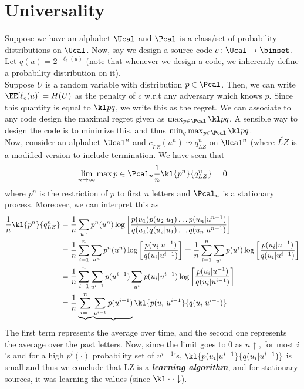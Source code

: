 \section{Universality}
Suppose we have an alphabet $\Ucal$ and $\Pcal$ is a class/set of probability distributions on $\Ucal$. Now, say we design a source code $c: \Ucal \to \binset$. Let $q(u) = 2^{-\ell_c(u)}$ (note that whenever we design a code, we inherently define a probability distribution on it). \\Suppose $U$ is a random variable with distribution $p \in \Pcal$. Then, we can write $\EE[\ell_c(u)] = H(U)$ as the penalty of $c$ w.r.t any adversary which knows $p$. Since this quantity is equal to $\kl pq$, we write this as the regret. We can associate to any code design the maximal regret given as $\max_{p \in \Pcal} \kl pq$. A sensible way to design the code is to minimize this, and thus $\min_q \max_{p\in\Pcal} \kl pq$. \\
Now, consider an alphabet $\Ucal^n$ and $c_{\widetilde{LZ}}(u^n) \leadsto q^n_{LZ}$ on $\Ucal^n$ (where $\widetilde{LZ}$ is a modified version to include termination. We have seen that 
\[\lim_{n\to\infty} \max{p \in \Pcal_n} \frac{1}{n}  \kl {p^n}{q^n_{LZ}} = 0 \] where $p^n$ is the restriction of $p$ to first $n$ letters and $\Pcal_n$ is a stationary process. Moreover, we can interpret this as
\begin{align*}
    \frac{1}{n} \kl {p^n}{q^n_{LZ}} &= \frac{1}{n} \sum_{u^n} p^n(u^n) \log\bigg[ \frac{p(u_1) p(u_2|u_1)\dots p(u_n|u^{n-1})}{q(u_1)q(u_2|u_1)\dots q(u_n|u^{n-1})}\bigg] \\
    &= \frac1n \sum_{i=1}^n \sum_{u^n} p^n(u^n) \log\bigg[\frac{p(u_i|u^{-1})}{q(u_i|u^{i-1})}\bigg] =  \frac1n \sum_{i=1}^n \sum_{u^i} p(u^i) \log\bigg[\frac{p(u_i|u^{-1})}{q(u_i|u^{i-1})}\bigg] \\
    &=  \frac1n \sum_{i=1}^n \sum_{u^{i-1}} p(u^{i-1}) \sum_{u^i} p(u_i|u^{i-1}) \log\bigg[\frac{p(u_i|u^{-1})}{q(u_i|u^{i-1})}\bigg] \\
    &= \frac{1}{n} \underbrace{\sum_{i=1}^n} \underbrace{\sum_{u^{i-1}} p(u^{i-1})} \kl {p(u_i|u^{i-1}}{q(u_i|u^{i-1})}
\end{align*}
The first term represents the average over time, and the second one represents the average over the past letters. Now, since the limit goes to $0$ as $n \uparrow$, for most $i$'s and for a high $p^i(\cdot)$ probability set of $u^{i-1}$'s, $\kl {p(u_i|u^{i-1}}{q(u_i|u^{i-1})}$ is small and thus we conclude that LZ is a \textbf{\textit{learning algorithm}}, and for stationary sources, it was learning the values (since $\kl \cdot \cdot \downarrow$).